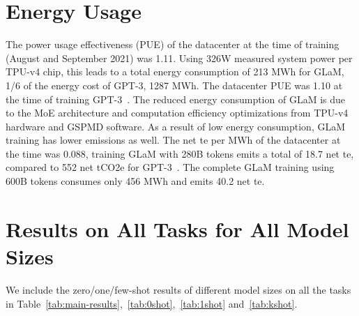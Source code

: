 \documentclass{article}
\newcommand{\glam}{GLaM\xspace}
\begin{document}
\section{Energy Usage}
\label{sec:energy}
The power usage effectiveness (PUE) of the datacenter at the time of training (August and September 2021) was 1.11. Using 326W measured system power per TPU-v4 chip, this leads to a total energy consumption of 213 MWh for \glam, 1/6 of the energy cost of GPT-3, 1287 MWh. The datacenter PUE was 1.10 at the time of training GPT-3~\cite{patterson2021carbon}. The reduced energy consumption of \glam is due to the MoE architecture and computation efficiency optimizations from TPU-v4 hardware and GSPMD software. As a result of low energy consumption, \glam training has lower  emissions as well. The net te per MWh of the datacenter at the time was 0.088, training \glam with 280B tokens emits a total of 18.7 net te, compared to 552 net tCO2e for GPT-3~\cite{patterson2021carbon}. The complete \glam training using 600B tokens consumes only 456 MWh and emits 40.2 net te.

\section{Results on All Tasks for All Model Sizes}
\label{sec:all_results}
We include the zero/one/few-shot results of different model sizes on all the tasks in Table~\ref{tab:main-results},~\ref{tab:0shot},~\ref{tab:1shot} and~\ref{tab:kshot}.
\end{document}
